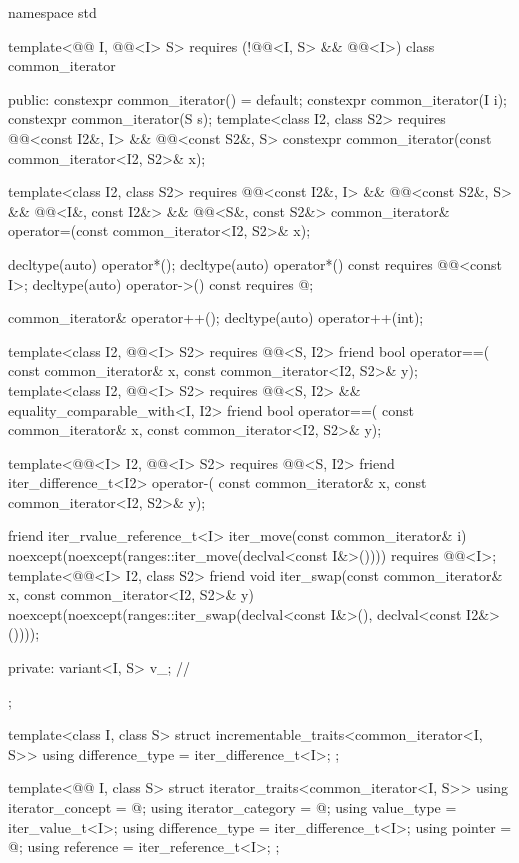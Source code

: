 %
\begin{codeblock}
namespace std {
  template<@@ I, @@<I> S>
    requires (!@@<I, S> && @@<I>)
  class common_iterator {
  public:
    constexpr common_iterator() = default;
    constexpr common_iterator(I i);
    constexpr common_iterator(S s);
    template<class I2, class S2>
      requires @@<const I2&, I> && @@<const S2&, S>
        constexpr common_iterator(const common_iterator<I2, S2>& x);

    template<class I2, class S2>
      requires @@<const I2&, I> && @@<const S2&, S> &&
               @@<I&, const I2&> && @@<S&, const S2&>
        common_iterator& operator=(const common_iterator<I2, S2>& x);

    decltype(auto) operator*();
    decltype(auto) operator*() const
      requires @@<const I>;
    decltype(auto) operator->() const
      requires @\seebelow@;

    common_iterator& operator++();
    decltype(auto) operator++(int);

    template<class I2, @@<I> S2>
      requires @@<S, I2>
    friend bool operator==(
      const common_iterator& x, const common_iterator<I2, S2>& y);
    template<class I2, @@<I> S2>
      requires @@<S, I2> && equality_comparable_with<I, I2>
    friend bool operator==(
      const common_iterator& x, const common_iterator<I2, S2>& y);

    template<@@<I> I2, @@<I> S2>
      requires @@<S, I2>
    friend iter_difference_t<I2> operator-(
      const common_iterator& x, const common_iterator<I2, S2>& y);

    friend iter_rvalue_reference_t<I> iter_move(const common_iterator& i)
      noexcept(noexcept(ranges::iter_move(declval<const I&>())))
        requires @@<I>;
    template<@@<I> I2, class S2>
      friend void iter_swap(const common_iterator& x, const common_iterator<I2, S2>& y)
        noexcept(noexcept(ranges::iter_swap(declval<const I&>(), declval<const I2&>())));

  private:
    variant<I, S> v_;   // \expos
  };

  template<class I, class S>
  struct incrementable_traits<common_iterator<I, S>> {
    using difference_type = iter_difference_t<I>;
  };

  template<@@ I, class S>
  struct iterator_traits<common_iterator<I, S>> {
    using iterator_concept = @\seebelow@;
    using iterator_category = @\seebelow@;
    using value_type = iter_value_t<I>;
    using difference_type = iter_difference_t<I>;
    using pointer = @\seebelow@;
    using reference = iter_reference_t<I>;
  };
}
\end{codeblock}

